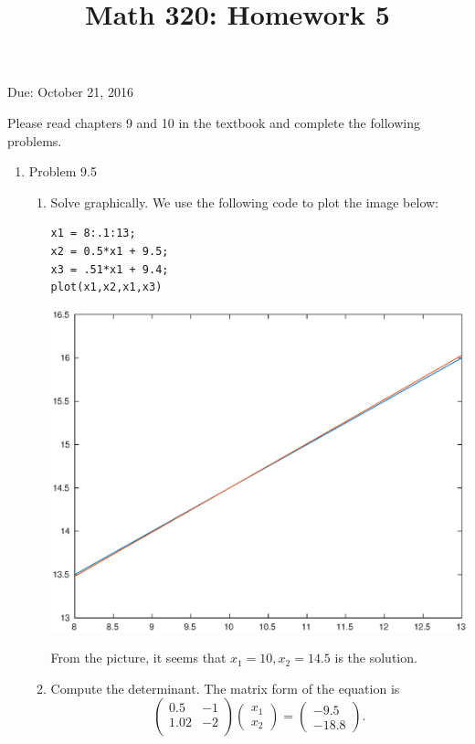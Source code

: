 \documentclass[12pt]{amsart}
\begin{document}
\title{Math 320: Homework 5}
Due: October 21, 2016
\maketitle


Please read chapters 9 and 10 in the textbook 
and complete the following problems.

\begin{enumerate}

\item Problem 9.5

\begin{enumerate}
\item Solve graphically. We use the following code to plot
the image below:
\begin{verbatim}
x1 = 8:.1:13;
x2 = 0.5*x1 + 9.5;
x3 = .51*x1 + 9.4;
plot(x1,x2,x1,x3)
\end{verbatim}
\includegraphics[width=.9\textwidth]{lines.eps}

From the picture, it seems that $x_1 = 10, x_2 = 14.5$ is the
solution.

\item Compute the determinant. The matrix form of the equation
is
\[ \left( \begin{array}{cc}
0.5 & -1 \\
1.02 & -2 \\
\end{array} \right)
\left( \begin{array}{c}
x_1 \\ x_2
\end{array}\right)
= \left( \begin{array}{c} -9.5 \\ -18.8 \end{array} \right).
\]


\end{enumerate}
\end{enumerate}
\end{document}
